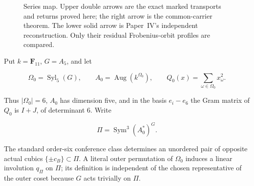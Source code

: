 \documentclass[11pt]{article}
\theoremstyle{definition}
\theoremstyle{remark}
\newcommand{\F}{\mathbf F}
\newcommand{\Sym}{\operatorname{Sym}}
\newcommand{\Aug}{\operatorname{Aug}}
\begin{document}
\begin{figure}[ht]
\centering
{}
\caption{Series map.  Upper double arrows are the exact marked transports and
returns proved here; the right arrow is the common-carrier theorem.  The
lower solid arrow is Paper~IV's independent reconstruction.  Only their
residual Frobenius-orbit profiles are compared.}
\label{fig:series-map}
\end{figure}

Put \(k=\F_{11}\), \(G=A_5\), and let

\[
 \Omega_0=\operatorname{Syl}_5(G),\qquad
 A_0=\Aug(k^{\Omega_0}),\qquad
 Q_0(x)=\sum_{\omega\in\Omega_0}x_\omega^2.
\]

Thus \(|\Omega_0|=6\), \(A_0\) has dimension five, and in the basis
\(e_i-e_6\) the Gram matrix of \(Q_0\) is \(I+J\), of determinant \(6\).
Write

\[
                   \Pi=\Sym^3(A_0^*)^G.
\]

The standard order-six conference class determines an unordered pair of
opposite actual cubics \(\{\pm c_B\}\subset\Pi\).  A literal outer permutation
of \(\Omega_0\) induces a linear involution \(q_\Pi\) on \(\Pi\); its definition
is independent of the chosen representative of the outer coset because \(G\)
acts trivially on \(\Pi\).
\end{document}
